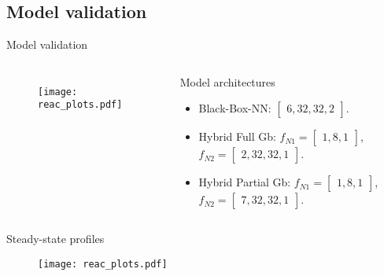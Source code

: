 \documentclass[xcolor=dvipsnames, 8pt]{beamer} %
\begin{document}
\subsection{Model validation}
\begin{frame}{Model validation}

\begin{columns}
	\begin{figure}
		\centering
		\texttt{[image: reac\_plots.pdf]}
	\end{figure}
	
	
	\begin{block}{Model architectures}
		
		\begin{itemize}
			\item Black-Box-NN: $\begin{bmatrix} 6, 32, 32, 2 \end{bmatrix}$.
			\item Hybrid Full Gb: $f_{N1} = \begin{bmatrix} 1, 8, 1 
			\end{bmatrix}$, $f_{N2} = \begin{bmatrix} 2, 32, 32, 1 
		\end{bmatrix}$.
			\item Hybrid Partial Gb: $f_{N1} = \begin{bmatrix} 1, 8, 1 
				\end{bmatrix}$, $f_{N2} = \begin{bmatrix} 7, 32, 32, 1 
				\end{bmatrix}$.
		\end{itemize}
		
	\end{block}
	
\end{columns}

\end{frame}


\begin{frame}{Steady-state profiles}
	
	\begin{figure}
		\centering
		\texttt{[image: reac\_plots.pdf]}
	\end{figure}
	
\end{frame}
\end{document}
